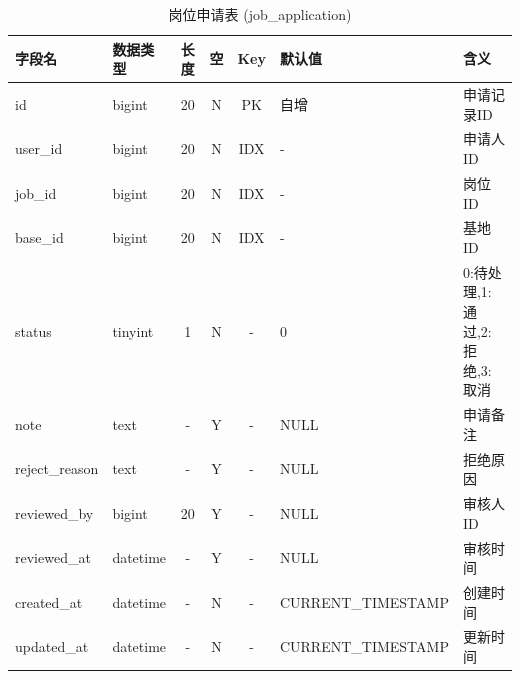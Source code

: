 \documentclass[UTF8,a4paper,12pt]{article}
\begin{document}
\begin{table}[H]
    \centering
    \caption{岗位申请表 (job\_application)}
    \label{tab:job_application}
    \small
    \renewcommand{\arraystretch}{1.3}
    \begin{tabular}{|l|l|c|c|c|l|l|}
        \hline
        \rowcolor{gray!15} \textbf{字段名} & \textbf{数据类型} & \textbf{长度} & \textbf{空} & \textbf{Key} & \textbf{默认值} & \textbf{含义} \\ \hline
        id & bigint & 20 & N & PK & 自增 & 申请记录ID \\ \hline
        user\_id & bigint & 20 & N & IDX & - & 申请人ID \\ \hline
        job\_id & bigint & 20 & N & IDX & - & 岗位ID \\ \hline
        base\_id & bigint & 20 & N & IDX & - & 基地ID \\ \hline
        status & tinyint & 1 & N & - & 0 & 0:待处理,1:通过,2:拒绝,3:取消 \\ \hline
        note & text & - & Y & - & NULL & 申请备注 \\ \hline
        reject\_reason & text & - & Y & - & NULL & 拒绝原因 \\ \hline
        reviewed\_by & bigint & 20 & Y & - & NULL & 审核人ID \\ \hline
        reviewed\_at & datetime & - & Y & - & NULL & 审核时间 \\ \hline
        created\_at & datetime & - & N & - & CURRENT\_TIMESTAMP & 创建时间 \\ \hline
        updated\_at & datetime & - & N & - & CURRENT\_TIMESTAMP & 更新时间 \\ \hline
    \end{tabular}
\end{table}
\end{document}
